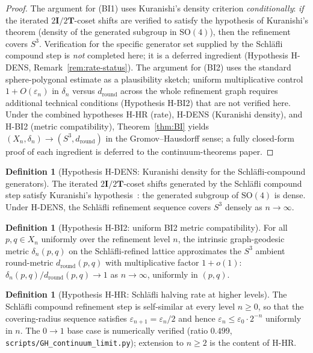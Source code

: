 \documentclass[12pt]{article}
\theoremstyle{definition}
\newtheorem{definition}[theorem]{Definition}
\theoremstyle{remark}
\newcommand{\twoT}{2\mathbf{T}}
\newcommand{\twoI}{2\mathbf{I}}
\begin{document}
\begin{proof}
The argument for (BI1) uses Kuranishi's density criterion \emph{conditionally}: \emph{if} the iterated $\twoI/\twoT$-coset shifts are verified to satisfy the hypothesis of Kuranishi's theorem (density of the generated subgroup in $\mathrm{SO}(4)$), then the refinement covers $S^3$. Verification for the specific generator set supplied by the Schl\"afli compound step is \emph{not} completed here; it is a deferred ingredient (Hypothesis H-DENS, Remark~\ref{rem:rate-status}). The argument for (BI2) uses the standard sphere-polygonal estimate as a plausibility sketch; uniform multiplicative control $1 + O(\varepsilon_n)$ in $\delta_n$ versus $d_{\mathrm{round}}$ across the whole refinement graph requires additional technical conditions (Hypothesis H-BI2) that are not verified here. Under the combined hypotheses H-HR (rate), H-DENS (Kuranishi density), and H-BI2 (metric compatibility), Theorem~\ref{thm:BI} yields $(X_n, \delta_n) \to (S^3, d_{\mathrm{round}})$ in the Gromov--Hausdorff sense; a fully closed-form proof of each ingredient is deferred to the continuum-theorems paper.
\end{proof}

\begin{definition}[Hypothesis H-DENS: Kuranishi density for the Schl\"afli-compound generators]\label{hyp:DENS}
The iterated $\twoI/\twoT$-coset shifts generated by the Schl\"afli compound step satisfy Kuranishi's hypothesis~\citep{Kuranishi1951}: the generated subgroup of $\mathrm{SO}(4)$ is dense. Under H-DENS, the Schl\"afli refinement sequence covers $S^3$ densely as $n \to \infty$.
\end{definition}

\begin{definition}[Hypothesis H-BI2: uniform BI2 metric compatibility]\label{hyp:BI2}
For all $p, q \in X_n$ uniformly over the refinement level $n$, the intrinsic graph-geodesic metric $\delta_n(p, q)$ on the Schl\"afli-refined lattice approximates the $S^3$ ambient round-metric $d_{\mathrm{round}}(p, q)$ with multiplicative factor $1 + o(1)$: $\delta_n(p, q) / d_{\mathrm{round}}(p, q) \to 1$ as $n \to \infty$, uniformly in $(p, q)$.
\end{definition}

\begin{definition}[Hypothesis H-HR: Schl\"afli halving rate at higher levels]\label{hyp:HR}
The Schl\"afli compound refinement step is self-similar at every level $n \ge 0$, so that the covering-radius sequence satisfies $\varepsilon_{n+1} = \varepsilon_n / 2$ and hence $\varepsilon_n \le \varepsilon_0 \cdot 2^{-n}$ uniformly in $n$. The $0 \to 1$ base case is numerically verified (ratio $0.499$, \texttt{scripts/GH\_continuum\_limit.py}); extension to $n \ge 2$ is the content of H-HR.
\end{definition}
\end{document}
